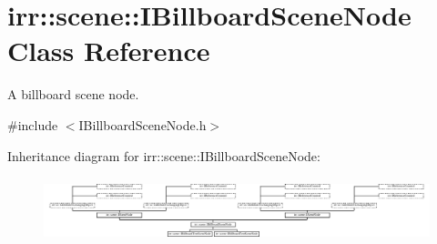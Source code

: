 \hypertarget{classirr_1_1scene_1_1IBillboardSceneNode}{}\section{irr\+:\+:scene\+:\+:I\+Billboard\+Scene\+Node Class Reference}
\label{classirr_1_1scene_1_1IBillboardSceneNode}


A billboard scene node.  




{\ttfamily \#include $<$I\+Billboard\+Scene\+Node.\+h$>$}

Inheritance diagram for irr\+:\+:scene\+:\+:I\+Billboard\+Scene\+Node\+:\begin{figure}[H]
\begin{center}
\leavevmode
\includegraphics[height=1.900452cm]{classirr_1_1scene_1_1IBillboardSceneNode}
\end{center}
\end{figure}
